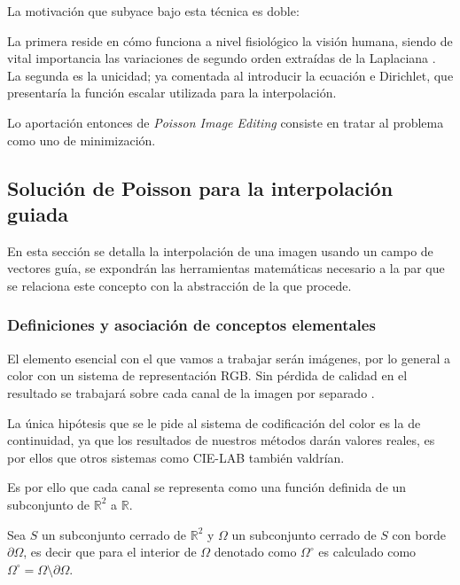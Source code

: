 \documentclass[11pt,twoside,titlepage,a4paper]{article}
\numberwithin{equation}{section} %
\theoremstyle{usual}
\begin{document}
La motivación que subyace bajo esta técnica es doble: 

La primera reside en cómo funciona a nivel fisiológico la visión humana, siendo de vital importancia las variaciones de segundo orden extraídas de la Laplaciana \cite{Land:71}. 
La segunda es la unicidad; ya comentada al introducir la ecuación e Dirichlet, que presentaría la  función escalar utilizada para la interpolación.   

Lo aportación entonces de \textit{Poisson Image Editing} \cite{poissonImageEditing}  consiste en tratar al problema como uno de minimización.  


\subsection{Solución de Poisson para la interpolación guiada  }

En esta sección se detalla la interpolación de una imagen usando un campo de vectores guía, se expondrán las herramientas matemáticas necesario a la par que se relaciona este concepto con la abstracción de la que procede. 

\subsubsection{ Definiciones y asociación de conceptos elementales}

El elemento esencial con el que vamos a trabajar serán imágenes, por lo general a color con un sistema de representación RGB. Sin pérdida de calidad en el resultado se trabajará sobre cada canal de la imagen por separado \cite{poissonImageEditing} \label{observacion:canales}.  

La única hipótesis que se le pide al sistema de codificación del color es la de continuidad, ya que los resultados de nuestros métodos darán valores reales, es por ellos que otros sistemas como CIE-LAB también valdrían. 

 
Es por ello que cada canal se representa como una función definida de un subconjunto de $\mathbb R^2 $ a $\mathbb R$. 

 Sea $S$ un subconjunto cerrado de $\mathbb{R}^2$ y $\Omega$ un subconjunto cerrado de $S$ con borde $\partial \Omega$, es decir que para el interior de $\Omega$ denotado como  $\Omega ^ \circ$ es calculado como $\Omega ^ \circ = \Omega \setminus \partial \Omega$.  
 
\end{document}

